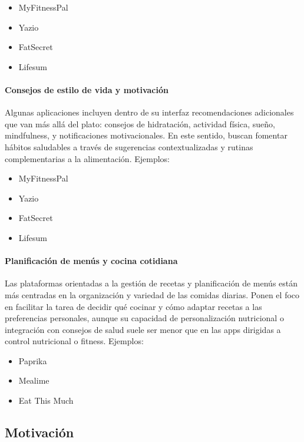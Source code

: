 \begin{itemize}
  \item MyFitnessPal
  \item Yazio
  \item FatSecret
  \item Lifesum
\end{itemize}

\paragraph*{Consejos de estilo de vida y motivación}
Algunas aplicaciones incluyen dentro de su interfaz recomendaciones adicionales que van más allá del plato: consejos de hidratación, actividad física, sueño, mindfulness, y notificaciones motivacionales. En este sentido, buscan fomentar hábitos saludables a través de sugerencias contextualizadas y rutinas complementarias a la alimentación. Ejemplos:

\begin{itemize}
  \item MyFitnessPal
  \item Yazio
  \item FatSecret
  \item Lifesum
\end{itemize}

\paragraph*{Planificación de menús y cocina cotidiana}
Las plataformas orientadas a la gestión de recetas y planificación de menús están más centradas en la organización y variedad de las comidas diarias. Ponen el foco en facilitar la tarea de decidir qué cocinar y cómo adaptar recetas a las preferencias personales, aunque su capacidad de personalización nutricional o integración con consejos de salud suele ser menor que en las apps dirigidas a control nutricional o fitness. Ejemplos:

\begin{itemize}
  \item Paprika
  \item Mealime
  \item Eat This Much
\end{itemize}

\subsection*{Motivación}

